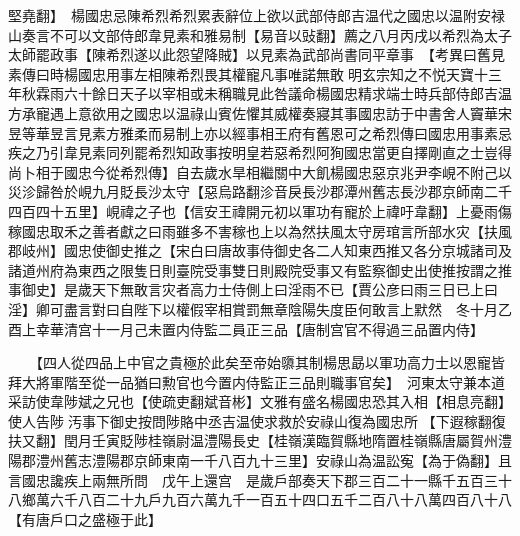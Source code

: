 堅堯翻】　楊國忠忌陳希烈希烈累表辭位上欲以武部侍郎吉温代之國忠以温附安禄山奏言不可以文部侍郎韋見素和雅易制【易音以䜴翻】薦之八月丙戌以希烈為太子太師罷政事【陳希烈遂以此怨望降賊】以見素為武部尚書同平章事　【考異曰舊見素傳曰時楊國忠用事左相陳希烈畏其權寵凡事唯諾無敢明玄宗知之不悦天寶十三年秋霖雨六十餘日天子以宰相或未稱職見此咎議命楊國忠精求端士時兵部侍郎吉温方承寵遇上意欲用之國忠以温祿山賓佐懼其威權奏寢其事國忠訪于中書舍人竇華宋昱等華昱言見素方雅柔而易制上亦以經事相王府有舊恩可之希烈傳曰國忠用事素忌疾之乃引韋見素同列罷希烈知政事按明皇若惡希烈阿狥國忠當更自擇剛直之士豈得尚卜相于國忠今從希烈傳】自去歲水旱相繼關中大飢楊國忠惡京兆尹李峴不附己以災沴歸咎於峴九月貶長沙太守【惡烏路翻沴音戾長沙郡潭州舊志長沙郡京師南二千四百四十五里】峴禕之子也【信安王禕開元初以軍功有寵於上禕吁韋翻】上憂雨傷稼國忠取禾之善者獻之曰雨雖多不害稼也上以為然扶風太守房琯言所部水灾【扶風郡岐州】國忠使御史推之【宋白曰唐故事侍御史各二人知東西推又各分京城諸司及諸道州府為東西之限隻日則臺院受事雙日則殿院受事又有監察御史出使推按謂之推事御史】是歲天下無敢言灾者高力士侍側上曰淫雨不已【賈公彦曰雨三日已上曰淫】卿可盡言對曰自陛下以權假宰相賞罰無章陰陽失度臣何敢言上默然　冬十月乙酉上幸華清宫十一月己未置内侍監二員正三品【唐制宫官不得過三品置内侍】

　　【四人從四品上中官之貴極於此矣至帝始隳其制楊思勗以軍功高力士以恩寵皆拜大將軍階至從一品猶曰勲官也今置内侍監正三品則職事官矣】　河東太守兼本道采訪使韋陟斌之兄也【使疏吏翻斌音彬】文雅有盛名楊國忠恐其入相【相息亮翻】使人告陟汚事下御史按問陟賂中丞吉温使求救於安祿山復為國忠所【下遐稼翻復扶又翻】閏月壬寅貶陟桂嶺尉温澧陽長史【桂嶺漢臨賀縣地隋置桂嶺縣唐屬賀州澧陽郡澧州舊志澧陽郡京師東南一千八百九十三里】安祿山為温訟寃【為于偽翻】且言國忠讒疾上兩無所問　戊午上還宫　是歲戶部奏天下郡三百二十一縣千五百三十八鄉萬六千八百二十九戶九百六萬九千一百五十四口五千二百八十八萬四百八十八【有唐戶口之盛極于此】

